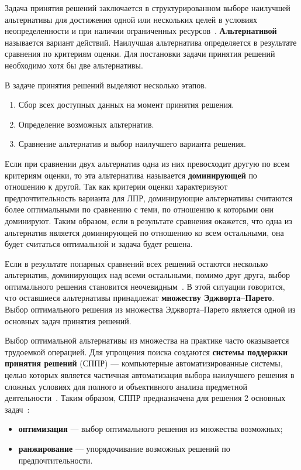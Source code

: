 Задача принятия решений заключается в структурированном выборе наилучшей альтернативы для достижения одной или нескольких целей в условиях неопределенности и при наличии ограниченных ресурсов~\cite{larichev}.
\textbf{Альтернативой} называется вариант действий.
Наилучшая альтернатива определяется в результате сравнения по критериям оценки.
Для постановки задачи принятия решений необходимо хотя бы две альтернативы.

В задаче принятия решений выделяют несколько этапов.
\begin{enumerate} 
    \item Сбор всех доступных данных на момент принятия решения.
    \item Определение возможных альтернатив.
    \item Сравнение альтернатив и выбор наилучшего варианта решения.
\end{enumerate}


Если при сравнении двух альтернатив одна из них превосходит другую по всем критериям оценки, то эта альтернатива называется \textbf{доминирующей} по отношению к другой.
Так как критерии оценки характеризуют предпочтительность варианта для ЛПР, доминирующие альтернативы считаются более оптимальными по сравнению с теми, по отношению к которыми они доминируют.
Таким образом, если в результате сравнения окажется, что одна из альтернатив является доминирующей по отношению ко всем остальными, она будет считаться оптимальной и задача будет решена.

Если в результате попарных сравнений всех решений остаются несколько альтернатив, доминирующих над всеми остальными, помимо друг друга, выбор оптимального решения становится неочевидным~\cite{chernomor}.
В этой ситуации говорится, что оставшиеся альтернативы принадлежат \textbf{множеству Эджворта--Парето}.
Выбор оптимального решения из множества Эджворта--Парето является одной из основных задач принятия решений.

Выбор оптимальной альтернативы из множества на практике часто оказывается трудоемкой операцией.
Для упрощения поиска создаются \textbf{системы поддержки принятия решений} (СППР) --- компьютерные автоматизированные системы, целью которых является частичная автоматизация выбора наилучшего решения в сложных условиях для полного и объективного анализа предметной деятельности~\cite{starodubcev}.
Таким образом, СППР предназначена для решения 2 основных задач~\cite{larichev}:
\begin{itemize} 
    \item \textbf{оптимизация} --- выбор оптимального решения из множества возможных;
    \item \textbf{ранжирование} --- упорядочивание возможных решений по предпочтительности.
\end{itemize}

